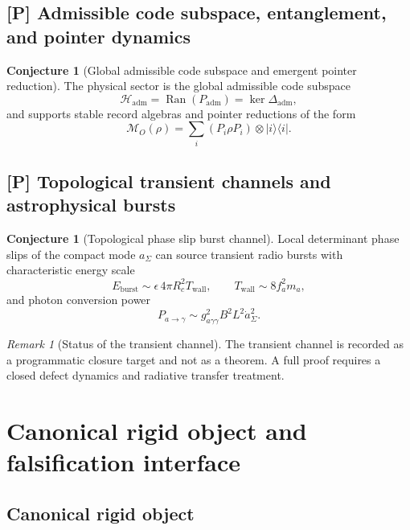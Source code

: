 \documentclass[11pt,a4paper]{article}
\theoremstyle{definition}
\newtheorem{conjecture}[theorem]{Conjecture}
\theoremstyle{remark}
\newtheorem*{remark}{Remark}
\newcommand{\Padm}{P_{\mathrm{adm}}}
\begin{document}
\subsection{[P] Admissible code subspace, entanglement, and pointer dynamics}

\begin{conjecture}[Global admissible code subspace and emergent pointer reduction]
\label{prop:global_admissible_code_subspace}
The physical sector is the global admissible code subspace
\[
\mathcal H_{\mathrm{adm}}=\operatorname{Ran}(\Padm)=\ker\Delta_{\mathrm{adm}},
\]
and supports stable record algebras and pointer reductions of the form
\[
\mathcal M_O(\rho)=\sum_i (P_i\rho P_i)\otimes |i\rangle\langle i|.
\]
\end{conjecture}

\subsection{[P] Topological transient channels and astrophysical bursts}

\begin{conjecture}[Topological phase slip burst channel]
\label{conj:topological_phase_slip_burst_channel}
Local determinant phase slips of the compact mode \(a_\Sigma\) can source transient
radio bursts with characteristic energy scale
\[
E_{\mathrm{burst}}\sim \epsilon\,4\pi R_c^2T_{\mathrm{wall}},
\qquad
T_{\mathrm{wall}}\sim 8f_a^2m_a,
\]
and photon conversion power
\[
P_{a\to\gamma}\sim g_{a\gamma\gamma}^2B^2L^2\dot a_\Sigma^2.
\]
\end{conjecture}

\begin{remark}[Status of the transient channel]
The transient channel is recorded as a programmatic closure target and not as a theorem. A full
proof requires a closed defect dynamics and radiative transfer treatment.
\end{remark}

\section{Canonical rigid object and falsification interface}

\subsection{Canonical rigid object}
\end{document}
